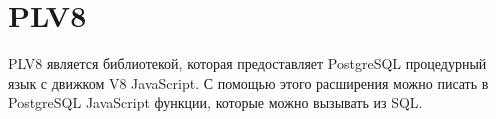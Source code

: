 \section{PLV8}

PLV8 является библиотекой, которая предоставляет PostgreSQL процедурный язык с движком V8 JavaScript. С помощью этого расширения можно писать в PostgreSQL JavaScript функции, которые можно вызывать из SQL.